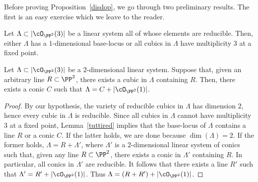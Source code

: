 Before proving Proposition~\ref{disdop}, we go through two preliminary results. The first is an easy exercise which we leave to the reader.

\begin{lemm}\label{tuttired}
Let $\Lambda\subset|\cO_{\PP^2}(3)|$ be a linear system all of whose elements are reducible. Then, either $\Lambda$ has a $1$-dimensional base-locus or all cubics in $\Lambda$ have multiplicity $3$ at a fixed point.
\end{lemm}

\begin{prop}\label{quadsig}
Let $\Lambda\subset|\cO_{\PP^2}(3)|$ be a $2$-dimensional linear system.
Suppose that, given an arbitrary line $R\subset\PP^2$, there exists a cubic in $\Lambda$ containing $R$. Then, there exists a conic $C$ such that $\Lambda=C+|\cO_{\PP^2}(1)|$.
\end{prop}

\begin{proof}
By our hypothesis, the variety of reducible cubics in $\Lambda$ has dimension $2$, hence every cubic in $\Lambda$ is reducible. Since all cubics in $\Lambda$ cannot have multiplicity $3$ at a fixed point,
Lemma~\ref{tuttired} implies that the base-locus of $\Lambda$ contains a line $R$ or a conic $C$. If the latter holds, we are done because $\dim(\Lambda)=2$. If the former holds,
$\Lambda=R+\Lambda'$, where $\Lambda'$ is a $2$-dimensional linear system of conics such that, given any line $R\subset\PP^2$, there exists a conic in $\Lambda'$ containing $R$. In particular, all conics in $\Lambda'$ are reducible. It follows that there exists a line $R'$ such that $\Lambda'=R'+|\cO_{\PP^2}(1)|$. Thus $\Lambda=(R+R')+|\cO_{\PP^2}(1)|$.
\end{proof}


